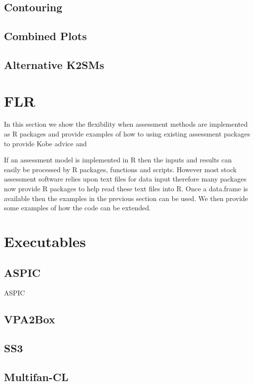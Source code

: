 \documentclass[a4paper, 11pt, oldtoc]{artikel1}
\begin{document}
\subsection*{Contouring}

\subsection*{Combined Plots}

\subsection*{Alternative K2SMs}

\section*{FLR}

In this section we show the flexibility when assessment methods are implemented as R packages and provide examples of how to using existing assessment packages 
to provide Kobe advice and 

If an assessment model is implemented in R then the inputs and results can easily be processed by R packages, functions and scripts. However most stock assessment 
software relies upon text files for data input therefore many packages now provide R packages to help read these text files into R. Once a data.frame is
available then the examples in the previous section can be used. We then provide some examples of how the code can be extended. 

\section*{Executables}

\subsection*{ASPIC}

ASPIC

\subsection*{VPA2Box}
\subsection*{SS3}
\subsection*{Multifan-CL}
\end{document}
